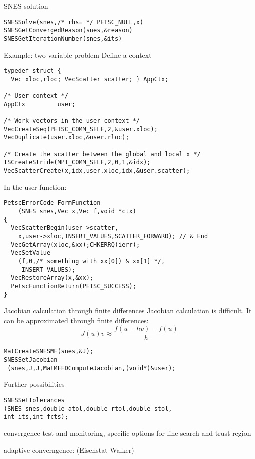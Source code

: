 \begin{numberedframe}{SNES solution}
\begin{lstlisting}
SNESSolve(snes,/* rhs= */ PETSC_NULL,x)
SNESGetConvergedReason(snes,&reason)
SNESGetIterationNumber(snes,&its)
\end{lstlisting}
\end{numberedframe}

\begin{numberedframe}{Example: two-variable problem}
Define a context
\begin{verbatim}
typedef struct {
  Vec xloc,rloc; VecScatter scatter; } AppCtx;

/* User context */
AppCtx         user;

/* Work vectors in the user context */
VecCreateSeq(PETSC_COMM_SELF,2,&user.xloc);
VecDuplicate(user.xloc,&user.rloc);

/* Create the scatter between the global and local x */
ISCreateStride(MPI_COMM_SELF,2,0,1,&idx);
VecScatterCreate(x,idx,user.xloc,idx,&user.scatter);
\end{verbatim}
\end{numberedframe}

\begin{numberedframe}
In the user function:
\begin{verbatim}
PetscErrorCode FormFunction
    (SNES snes,Vec x,Vec f,void *ctx)
{
  VecScatterBegin(user->scatter,
    x,user->xloc,INSERT_VALUES,SCATTER_FORWARD); // & End
  VecGetArray(xloc,&xx);CHKERRQ(ierr);
  VecSetValue
    (f,0,/* something with xx[0]) & xx[1] */,
     INSERT_VALUES);
  VecRestoreArray(x,&xx);
  PetscFunctionReturn(PETSC_SUCCESS);
}
\end{verbatim}
\end{numberedframe}

\begin{numberedframe}{Jacobian calculation through
    finite differences}
Jacobian calculation is difficult. It can be approximated through
finite differences:
\[ J(u)v \approx \frac{f(u+hv)-f(u)}{h} \]
\begin{verbatim}
MatCreateSNESMF(snes,&J);
SNESSetJacobian
 (snes,J,J,MatMFFDComputeJacobian,(void*)&user);
\end{verbatim}
\end{numberedframe}

\begin{numberedframe}{Further possibilities}

\begin{lstlisting}
SNESSetTolerances
(SNES snes,double atol,double rtol,double stol,
int its,int fcts);
\end{lstlisting}

convergence test and monitoring, specific options for line search and
trust region

adaptive converngence:  (Eisenstat Walker)
\end{numberedframe}


